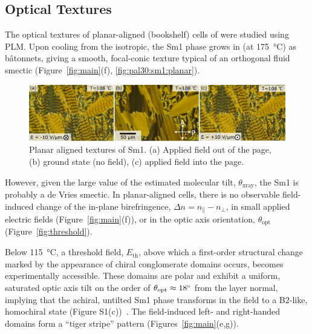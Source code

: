 \documentclass[aagreenthesis]{subfiles}
\begin{document}
\subsection{Optical Textures}
The optical textures of planar-aligned (bookshelf) cells of
 were studied using PLM.
Upon cooling from the isotropic, the Sm1 phase grows in (at \SI{175}{\degreeCelsius})
as b\^{a}tonnets, giving a smooth, focal-conic texture typical of an orthogonal
fluid smectic (Figure~\ref{fig:main}(f), \autoref{fig:pal30:sm1:planar}).
\begin{figure}[h!]
    \centering
    \includegraphics[width=\textwidth]{figs/pal30/textureSM1/sm1Textures100.png}
    \caption{\label{fig:pal30:sm1:planar} Planar aligned textures of Sm1. (a)
        Applied field out of the page, (b) ground state (no field), (c) applied
    field into the page.}
\end{figure}

However, given the large value of the estimated
molecular tilt, $\theta_\textrm{xray}$, the Sm1 is probably a de Vries
smectic.
In planar-aligned cells, there is no observable field-induced change of the in-plane birefringence, $\Delta n= n_\parallel
-n_\perp$, in small applied electric fields  (Figure~\ref{fig:main}(f)),
or in the optic axis orientation, $\theta_\text{opt}$ (Figure~\ref{fig:threshold}).

Below \SI{115}{\degreeCelsius}, a threshold field, $E_\text{th}$, above which a first-order structural change marked by the appearance of chiral conglomerate domains occurs, becomes experimentally accessible.
These domains are polar and exhibit a uniform, saturated optic axis tilt on the
order of $\theta_{\rm opt} \approx \SI{18}{\degree}$ from the layer normal, implying that the achiral, untilted Sm1 phase
transforms in the field to a B2-like, homochiral  state (Figure
S1(c))~\cite{eremin2008electrically}. The field-induced left- and right-handed domains form a ``tiger stripe''
pattern (Figures~\ref{fig:main}(e,g)). 
\end{document}
